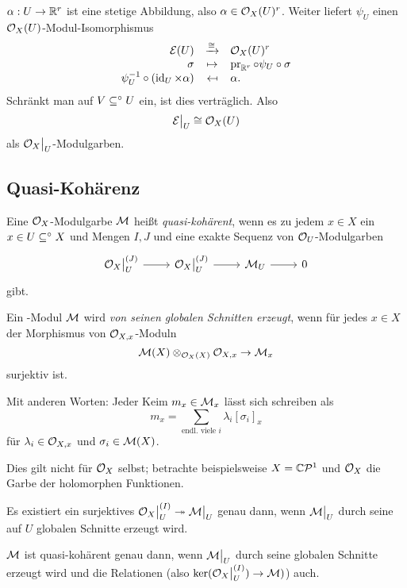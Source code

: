 $\alpha: U \to \mathbb{R}^r$ ist eine stetige Abbildung, also
$\alpha \in \mathcal{O}_X(U)^r$. Weiter liefert $\psi_U$ einen 
$\mathcal{O}_X(U)$-Modul-Isomorphismus
\[
    \funcdef{ \cal E(U) & \xto{\cong} & \O_X(U)^r \\ 
        \sigma & \mapsto & \pr_{\R^r} \circ \psi_U \circ \sigma \\
        \psi_U\inv \circ (\id_U \times \alpha)  & \mapsfrom & \alpha.}
\]
Schränkt man auf $V \subseteq^\circ U$ ein, ist dies verträglich. Also
\[ \mathcal E\big|_{U} \cong \mathcal{O}_X(U)\]
als $\mathcal{O}_X\big|_{U}$-Modulgarben.

\subsection{Quasi-Kohärenz}

\begin{definition}
    Eine $\mathcal{O}_X$-Modulgarbe $\mathcal{M}$ heißt \emph{quasi-kohärent}, wenn es
    zu jedem $x\in X$ ein $x \in U \subseteq^\circ X$ und Mengen $I,J$ und
    eine exakte Sequenz von $\mathcal{O}_U$-Modulgarben
    \[\begin{tikzcd}
        \O_X\rest U^{(J)} \rar &\O_X\rest U^{(J)} \rar &
        \M_U \rar & 0
    \end{tikzcd}\]
    gibt.
\end{definition}

\begin{definition}
    Ein \OX-Modul $\mathcal{M}$ wird \emph{von seinen globalen Schnitten erzeugt},
    wenn für jedes $x\in X$ der Morphismus von $\mathcal{O}_{X,x}$-Moduln
    \[ \mathcal{M}(X) \otimes_{\mathcal{O}_X(X)} \mathcal{O}_{X,x} \to \mathcal{M}_x\]
    surjektiv ist.
\end{definition}

Mit anderen Worten: Jeder Keim $m_x \in \mathcal{M}_x$ lässt sich schreiben als
\[ m_x = \sum_{\text{endl. viele }i} \lambda_i [\sigma_i]_x\]
für $\lambda_i \in \mathcal{O}_{X,x}$ und $\sigma_i \in \mathcal{M}(X)$.

Dies gilt nicht für $\mathcal{O}_X$ selbst; betrachte beispielsweise
$X = \mathbb{C}\mathcal P^1$ und $\mathcal{O}_X$ die Garbe der holomorphen Funktionen.

\begin{bemerkung}
    Es existiert ein surjektives 
    $\mathcal{O}_X\big|_{U}^{(I)} \twoheadrightarrow \mathcal{M}\big|_{U}$ genau dann, wenn
    $\mathcal{M}\big|_{U}$ durch seine auf $U$ globalen Schnitte erzeugt wird.
    
    $\mathcal{M}$ ist quasi-kohärent genau dann, wenn
    $\mathcal{M}\big|_{U}$ durch seine globalen Schnitte erzeugt wird und die Relationen
    (also $\ker(\mathcal{O}_X\big|_{U}^{(I)}) \to \mathcal{M})$) auch.  
\end{bemerkung}

